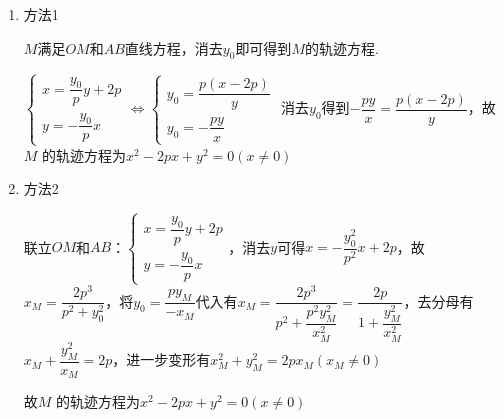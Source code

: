 \begin{enumerate}
\begin{enumerate}
\begin{jieda}
\begin{enumerate}
                \begin{enumerate}
                    \item 方法1
    
                    $M$满足$OM$和$AB$直线方程，消去$y_0$即可得到$M$的轨迹方程.
    
                    $\left\{\begin{array}{l}
                     x = \dfrac{y_0}{p} y + 2p  \\
                     y = -\dfrac{y_0}{p}x 
                    \end{array}\right. \Longleftrightarrow \left\{\begin{array}{l}
                     y_0 = \dfrac{p(x-2p)}{y}  \\
                     y_0 = -\dfrac{py}{x} 
                    \end{array}\right.$
                    消去$y_0$得到$-\dfrac{py}{x} = \dfrac{p(x-2p)}{y}$，故$M$ 的轨迹方程为$x^2 - 2px + y^2 = 0 (x \neq 0)$
                    \item 方法2
    
                    联立$OM$和$AB$：$\left\{\begin{array}{l}
                     x = \dfrac{y_0}{p} y + 2p  \\
                     y = -\dfrac{y_0}{p}x 
                    \end{array}\right.$，消去$y$可得$x = -\dfrac{y_0^2}{p^2}x + 2p$，故$x_M = \dfrac{2p^3}{p^2+y_0^2}$，将$y_0 = \dfrac{py_M}{-x_M}$代入有$x_M = \dfrac{2p^3}{p^2+\dfrac{p^2y_M^2}{x_M^2}} = \dfrac{2p}{1+\dfrac{y_M^2}{x_M^2}}$，去分母有$x_M + \dfrac{y_M^2}{x_M} = 2p$，进一步变形有$x_M^2 + y_M^2 = 2px_M (x_M \neq 0)$
        
                    故$M$ 的轨迹方程为$x^2 - 2px + y^2 = 0 (x \neq 0)$
                \end{enumerate}
            \end{enumerate}
        \end{jieda}
    \end{enumerate}



\end{enumerate}
